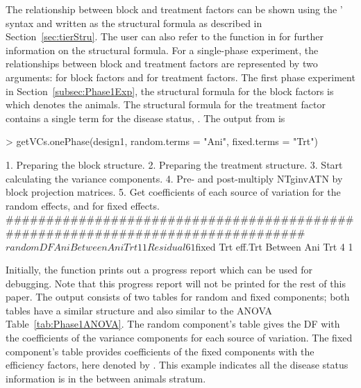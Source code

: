 \documentclass[article]{jss}
\begin{document}
The relationship between block and treatment factors can be shown using the \citeauthor{Wilkinson1973}' syntax and written as the structural formula as described in Section~\ref{sec:tierStru}. The user can also refer to the  function in  for further information on the structural formula. For a single-phase experiment, the relationships between block and treatment factors are represented by two arguments:  for block factors and  for treatment factors. The first phase experiment in Section~\ref{subsec:Phase1Exp}, the structural formula for the block factors is  which denotes the animals. The structural formula for the treatment factor contains a single term for the disease status, . The output from  is 
\begin{CodeChunk}
\begin{CodeInput}
> getVCs.onePhase(design1, random.terms = "Ani", fixed.terms = "Trt")
\end{CodeInput}
\begin{CodeOutput}
1. Preparing the block structure.
2. Preparing the treatment structure.
3. Start calculating the variance components.
4. Pre- and post-multiply NTginvATN by block projection matrices.
5. Get coefficients of each source of variation for the random effects,
   and for fixed effects.
################################################################################
$random
            DF Ani
Between Ani       
   Trt      1  1  
   Residual 6  1  

$fixed
            Trt eff.Trt
Between Ani            
   Trt      4   1      
\end{CodeOutput}
\end{CodeChunk}
Initially, the function prints out a progress report which can be used for debugging. Note that this progress report will not be printed for the rest of this paper. The output consists of two tables for random and fixed components; both tables have a similar structure and also similar to the ANOVA Table~\ref{tab:Phase1ANOVA}. The random component's table gives the DF with the coefficients of the variance components for each source of variation. The fixed component's table provides coefficients of the fixed components with the efficiency factors, here denoted by . This example indicates all the disease status information is in the between animals stratum.
\end{document}
